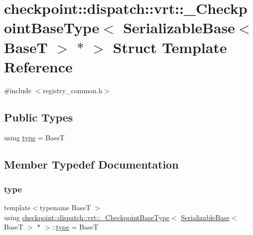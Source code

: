 \hypertarget{structcheckpoint_1_1dispatch_1_1vrt_1_1___checkpoint_base_type_3_01_serializable_base_3_01_base_t_01_4_01_5_01_4}{}\section{checkpoint\+:\+:dispatch\+:\+:vrt\+:\+:\+\_\+\+Checkpoint\+Base\+Type$<$ Serializable\+Base$<$ BaseT $>$ $\ast$ $>$ Struct Template Reference}
\label{structcheckpoint_1_1dispatch_1_1vrt_1_1___checkpoint_base_type_3_01_serializable_base_3_01_base_t_01_4_01_5_01_4}


{\ttfamily \#include $<$registry\+\_\+common.\+h$>$}

\subsection*{Public Types}
\begin{DoxyCompactItemize}
\item 
using \hyperlink{structcheckpoint_1_1dispatch_1_1vrt_1_1___checkpoint_base_type_3_01_serializable_base_3_01_base_t_01_4_01_5_01_4_a87db9fade8fd11cef8282332bea31366}{type} = BaseT
\end{DoxyCompactItemize}


\subsection{Member Typedef Documentation}
\mbox{\label{structcheckpoint_1_1dispatch_1_1vrt_1_1___checkpoint_base_type_3_01_serializable_base_3_01_base_t_01_4_01_5_01_4_a87db9fade8fd11cef8282332bea31366}} 
\subsubsection{\texorpdfstring{type}{type}}
{\footnotesize\ttfamily template$<$typename BaseT $>$ \\
using \hyperlink{structcheckpoint_1_1dispatch_1_1vrt_1_1___checkpoint_base_type}{checkpoint\+::dispatch\+::vrt\+::\+\_\+\+Checkpoint\+Base\+Type}$<$ \hyperlink{structcheckpoint_1_1dispatch_1_1vrt_1_1_serializable_base}{Serializable\+Base}$<$ BaseT $>$ $\ast$ $>$\+::\hyperlink{structcheckpoint_1_1dispatch_1_1vrt_1_1___checkpoint_base_type_3_01_serializable_base_3_01_base_t_01_4_01_5_01_4_a87db9fade8fd11cef8282332bea31366}{type} =  BaseT}



